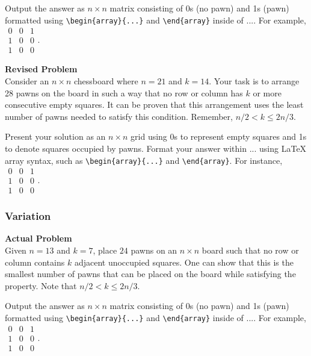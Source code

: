 Output the answer as $n \times n$ matrix consisting of 0s (no pawn) and 1s (pawn) formatted using \verb|\begin{array}{...}| and \verb|\end{array}| inside of $\boxed{...}$. For example, $\boxed{\begin{array}{ccc}0 & 0 & 1 \\ 1 & 0 & 0 \\ 1 & 0 & 0\end{array}}$.

\textbf{Revised Problem}\\
Consider an \( n \times n \) chessboard where \( n = 21 \) and \( k = 14 \). Your task is to arrange 28 pawns on the board in such a way that no row or column has \( k \) or more consecutive empty squares. It can be proven that this arrangement uses the least number of pawns needed to satisfy this condition. Remember, \( n/2 < k \leq 2n/3 \).

Present your solution as an \( n \times n \) grid using 0s to represent empty squares and 1s to denote squares occupied by pawns. Format your answer within $\boxed{...}$ using LaTeX array syntax, such as \verb|\begin{array}{...}| and \verb|\end{array}|. For instance, $\boxed{\begin{array}{ccc}0 & 0 & 1 \\ 1 & 0 & 0 \\ 1 & 0 & 0\end{array}}$.

\subsubsection{Variation}
\textbf{Actual Problem}\\
Given $n=13$ and $k=7$, place $24$ pawns on an $n \times n$ board such that no row or column contains $k$ adjacent unoccupied squares.
One can show that this is the smallest number of pawns that can be placed on the board while satisfying the property.
Note that $n/2 < k \leq 2n/3$.

Output the answer as $n \times n$ matrix consisting of 0s (no pawn) and 1s (pawn) formatted using \verb|\begin{array}{...}| and \verb|\end{array}| inside of $\boxed{...}$. For example, $\boxed{\begin{array}{ccc}0 & 0 & 1 \\ 1 & 0 & 0 \\ 1 & 0 & 0\end{array}}$.

